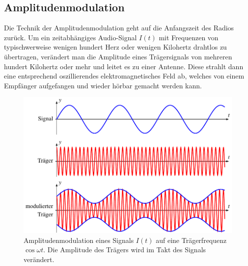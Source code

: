 %
%
%
\subsection{Amplitudenmodulation
\label{subsection:amplitudenmodulation}}
Die Technik der Amplitudenmodulation geht auf die Anfangszeit des
Radios zurück.
Um ein zeitabhängiges Audio-Signal $I(t)$ mit Frequenzen von typischwerweise
wenigen hundert Herz oder wenigen Kilohertz drahtlos zu übertragen,
verändert man die Amplitude eines Trägersignals von mehreren hundert
Kilohertz oder mehr und leitet es zu einer Antenne.
Diese strahlt dann eine entsprechend oszillierendes elektromagnetisches
Feld ab, welches von einem Empfänger aufgefangen und wieder hörbar gemacht
werden kann.

\begin{figure}
\centering
\includegraphics{applications/qam/images/am.pdf}
\caption{Amplitudenmodulation eines Signals $I(t)$ auf eine
Trägerfrequenz $\cos\omega t$.
Die Amplitude des Trägers wird im Takt des Signals verändert.
\label{figure:qam:am}}
\end{figure}

